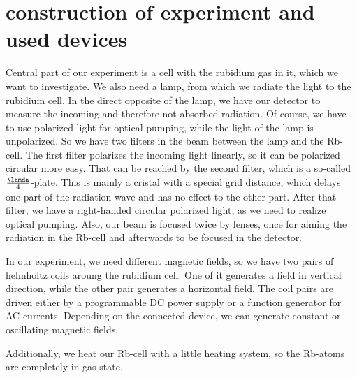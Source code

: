 \section{construction of experiment and used devices}
Central part of our experiment is a cell with the rubidium gas in it, which we want to investigate. We also need a lamp, from which we radiate the light to the rubidium cell. In the direct opposite of the lamp, we have our detector to measure the incoming and therefore not absorbed radiation. Of course, we have to use polarized light for optical pumping, while the light of the lamp is unpolarized. So we have two filters in the beam between the lamp and the Rb-cell. The first filter polarizes the incoming light linearly, so it can be polarized circular more easy. That can be reached by the second filter, which is a so-called $\frac{\lamda}{4}$-plate. This is mainly a cristal with a special grid distance, which delays one part of the radiation wave and has no effect to the other part. After that filter, we have a right-handed circular polarized light, as we need to realize optical pumping. Also, our beam is focused twice by lenses, once for aiming the radiation in the Rb-cell and afterwards to be focused in the detector. 

In our experiment, we need different magnetic fields, so we have two pairs of helmholtz coils aroung the rubidium cell. One of it generates a field in vertical direction, while the other pair generates a horizontal field. The coil pairs are driven  either by a programmable DC power supply or a function generator for AC currents. Depending on the connected device, we can generate constant or oscillating magnetic fields. 

Additionally, we heat our Rb-cell with a little heating system, so the Rb-atoms are completely in gas state. 

